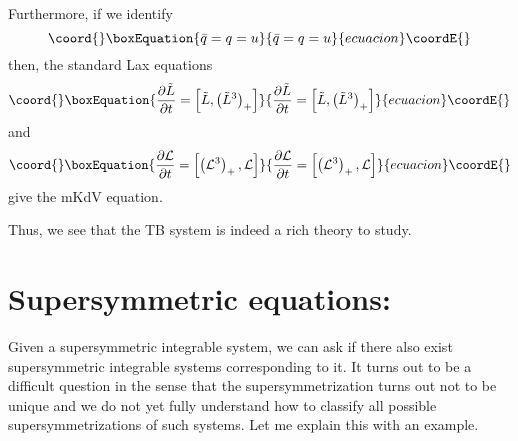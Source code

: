 \documentclass[a4paper,11pt]{article}
\begin{document}
Furthermore, if we identify
\begin{equation}\coord{}\boxEquation{
\bar{q} = q = u
}{
\bar{q} = q = u
}{ecuacion}\coordE{}\end{equation}
then, the standard Lax equations
\begin{equation}\coord{}\boxEquation{
{\partial \tilde{L}\over \partial t} =
\left[\tilde{L},\left(\tilde{L}^{3}\right)_{+}\right]
}{
{\partial \tilde{L}\over \partial t} =
\left[\tilde{L},\left(\tilde{L}^{3}\right)_{+}\right]
}{ecuacion}\coordE{}\end{equation}
and
\begin{equation}\coord{}\boxEquation{
{\partial {\cal L}\over \partial t} = \left[\left({\cal
L}^{3}\right)_{+},{\cal L}\right]
}{
{\partial {\cal L}\over \partial t} = \left[\left({\cal
L}^{3}\right)_{+},{\cal L}\right]
}{ecuacion}\coordE{}\end{equation}
give the mKdV equation.

Thus, we see that the TB system is indeed a rich theory to study.

\section{Supersymmetric equations:}

Given a supersymmetric integrable system, we can ask if there also
exist supersymmetric integrable systems corresponding to it. It turns
out to be a difficult question in the sense that the
supersymmetrization turns out not to be unique and we do not yet fully
understand how to classify all possible supersymmetrizations of such
systems. Let me explain this with an example.
\end{document}
